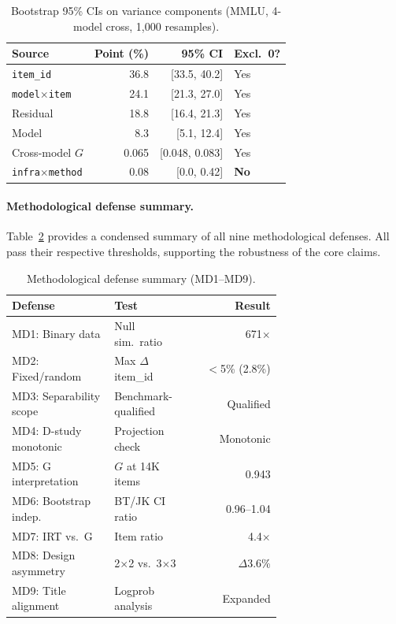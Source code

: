 \documentclass[letterpaper]{article}
\newcommand{\gcoeff}{\ensuremath{G}}
\newcommand{\pct}{\%}
\begin{document}
\begin{table}[t]
\centering
\caption{Bootstrap 95\pct{} CIs on variance components (MMLU, 4-model cross, 1,000 resamples).}
\label{tab:bootstrap-ci}
\small
\begin{tabular}{lrrl}
\toprule
Source & Point (\pct{}) & 95\pct{} CI & Excl.\ 0? \\
\midrule
\texttt{item\_id}            & 36.8 & [33.5, 40.2] & Yes \\
\texttt{model$\times$item}   & 24.1 & [21.3, 27.0] & Yes \\
Residual                      & 18.8 & [16.4, 21.3] & Yes \\
Model                         & 8.3  & [5.1, 12.4]  & Yes \\
Cross-model $\gcoeff{}$       & 0.065 & [0.048, 0.083] & Yes \\
\texttt{infra$\times$method} & 0.08 & [0.0, 0.42]  & \textbf{No} \\
\bottomrule
\end{tabular}
\end{table}

\paragraph{Methodological defense summary.}
Table~\ref{tab:md-summary} provides a condensed summary of all nine methodological defenses.
All pass their respective thresholds, supporting the robustness of the core claims.

\begin{table}[t]
\centering
\caption{Methodological defense summary (MD1--MD9).}
\label{tab:md-summary}
\small
\begin{tabular}{p{0.38\linewidth}p{0.30\linewidth}r}
\toprule
Defense & Test & Result \\
\midrule
MD1: Binary data & Null sim.\ ratio & 671$\times$ \\
MD2: Fixed/random & Max $\Delta$ item\_id & $<$5\pct{} (2.8\pct{}) \\
MD3: Separability scope & Benchmark-qualified & Qualified \\
MD4: D-study monotonic & Projection check & Monotonic \\
MD5: G interpretation & $\gcoeff{}$ at 14K items & 0.943 \\
MD6: Bootstrap indep. & BT/JK CI ratio & 0.96--1.04 \\
MD7: IRT vs.\ G & Item ratio & 4.4$\times$ \\
MD8: Design asymmetry & 2$\times$2 vs.\ 3$\times$3 & $\Delta$3.6\pct{} \\
MD9: Title alignment & Logprob analysis & Expanded \\
\bottomrule
\end{tabular}
\end{table}
\end{document}
